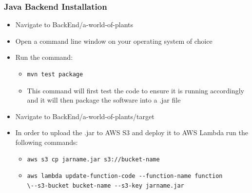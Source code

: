 \documentclass{article}
\begin{document}
		\subsubsection{Java Backend Installation}
			\begin{itemize}
				\item Navigate to BackEnd/a-world-of-plants
				\item Open a command line window on your operating system of choice
				\item Run the command:
				\begin{itemize}
					\item 
\begin{lstlisting}
mvn test package
\end{lstlisting}
					\item This command will first test the code to ensure it is running accordingly and it will then package the software into a .jar file
				\end{itemize}
				\item Navigate to BackEnd/a-world-of-plants/target
				\item In order to upload the .jar to AWS S3 and deploy it to AWS Lambda run the following commands:
					\begin{itemize}
						\item 
\begin{lstlisting}
aws s3 cp jarname.jar s3://bucket-name
\end{lstlisting}

						\item
\begin{lstlisting}
aws lambda update-function-code --function-name function 
\--s3-bucket bucket-name --s3-key jarname.jar
\end{lstlisting}
					\end{itemize}	
			\end{itemize}

\cleardoublepage		
\end{document}
